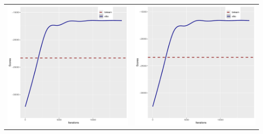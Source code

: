 \documentclass[]{scrartcl}
\begin{document}
\begin{tabular}{cc}
\includegraphics[scale = 0.4]{./figs/win95pts/mapEvolution-1-14252.pdf} &
\includegraphics[scale = 0.4]{./figs/win95pts/mapEvolution-2-14252.pdf} \\
\end{tabular}
\end{document}
